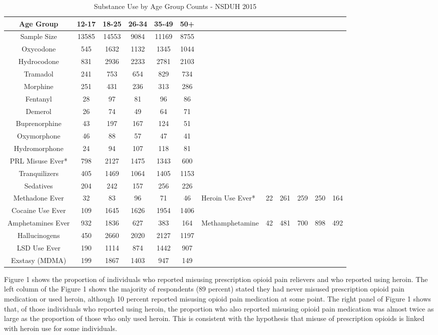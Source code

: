 \documentclass[sigconf]{acmart}
\begin{document}
\begin{table}
  \caption{Substance Use by Age Group Counts - NSDUH 2015
  \cite{samhsa16}}
  \label{tab:freq}
  \begin{tabular}{cccccc}
    \toprule
    Age Group & 12-17& 18-25& 26-34& 35-49& 50+\\
    \midrule
    Sample Size & 13585& 14553& 9084& 11169& 8755 \\
    \midrule
    Oxycodone& 545& 1632& 1132& 1345& 1044 \\
    Hydrocodone& 831& 2936& 2233& 2781& 2103 \\
    Tramadol& 241& 753& 654& 829& 734 \\
    Morphine& 251& 431& 236& 313& 286 \\
    Fentanyl& 28& 97& 81& 96& 86 \\
    Demerol& 26& 74& 49& 64& 71 \\
    Buprenorphine& 43& 197& 167& 124& 51 \\
    Oxymorphone& 46& 88& 57& 47& 41 \\
    Hydromorphone& 24& 94& 107& 118& 81 \\
    \midrule
    PRL Misuse Ever*& 798& 2127& 1475& 1343& 600 \\
    \midrule
    Tranquilizers& 405& 1469& 1064& 1405& 1153 \\
    Sedatives& 204& 242& 157& 256& 226 \\
    Methadone Ever& 32& 83& 96& 71& 46&
    \midrule
    Heroin Use Ever*& 22& 261& 259& 250& 164 \\
    \midrule
    Cocaine Use Ever& 109& 1645& 1626& 1954& 1406 \\
    Amphetamines Ever& 932& 1836& 627& 383& 164&
    Methamphetamine& 42& 481& 700&  898& 492 \\
    Hallucinogens& 450& 2660& 2020& 2127& 1197 \\
    LSD Use Ever& 190& 1114& 874& 1442& 907 \\
    Exstasy (MDMA)& 199& 1867& 1403& 947& 149 \\
    \bottomrule
  \end{tabular}
\end{table}


Figure 1 shows the proportion of individuals who reported misusing prescription 
opioid pain relievers and who reported using heroin. The left column of the 
Figure 1 shows the majority of respondents (89 percent) stated they had never 
misused prescription opioid pain medication or used heroin, although 10 percent 
reported misusing opioid pain medication at some point. The right panel of 
Figure 1 shows that, of those individuals who reported using heroin, the 
proportion who also reported misusing opioid pain medication was almost twice 
as large as the proportion of those who only used heroin. This is consistent 
with the hypothesis that misuse of prescription opioids is linked with heroin 
use for some individuals.
\end{document}
